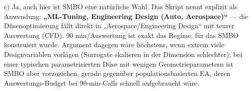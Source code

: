 \documentclass[11pt, a4paper]{article}
\begin{document}
c) Ja, auch hier ist SMBO eine natürliche Wahl. Das Skript nennt explizit als Anwendung: \textbf{„ML-Tuning, Engineering Design (Auto, Aerospace)“} — die Düsenoptimierung fällt direkt in „Aerospace/Engineering Design“ mit teurer Auswertung (CFD). 90 min/Auswertung ist exakt das Regime, für das SMBO konstruiert wurde. Argument dagegen wäre höchstens, wenn extrem viele Designvariablen vorlägen (Surrogate skalieren in der Dimension schlechter); bei einer typischen parametrisierten Düse mit wenigen Geometrieparametern ist SMBO aber vorzuziehen, gerade gegenüber populationsbasierten EA, deren Auswertungs-Budget bei 90-min-Calls schnell aufgebraucht wäre.





\end{document}
